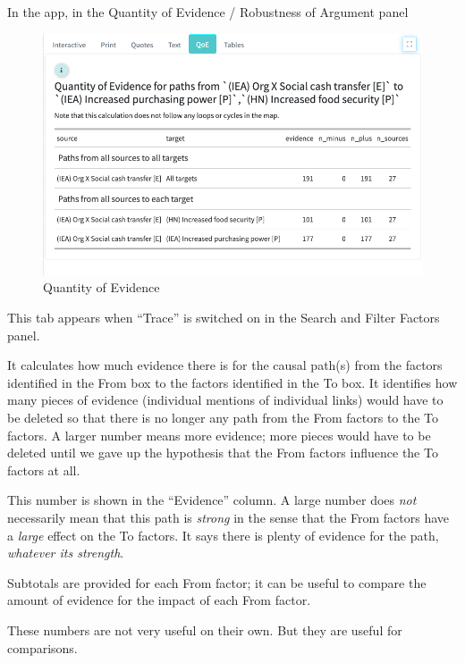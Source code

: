 \documentclass[
]{book}
\begin{document}
In the app, in the Quantity of Evidence / Robustness of Argument panel

\begin{figure}
\centering
\includegraphics{_assets/qoe.png}
\caption{Quantity of Evidence}
\end{figure}

This tab appears when ``Trace'' is switched on in the Search and Filter Factors panel.

It calculates how much evidence there is for the causal path(s) from the factors identified in the From box to the factors identified in the To box. It identifies how many pieces of evidence (individual mentions of individual links) would have to be deleted so that there is no longer any path from the From factors to the To factors. A larger number means more evidence; more pieces would have to be deleted until we gave up the hypothesis that the From factors influence the To factors at all.

This number is shown in the ``Evidence'' column. A large number does \emph{not} necessarily mean that this path is \emph{strong} in the sense that the From factors have a \emph{large} effect on the To factors. It says there is plenty of evidence for the path, \emph{whatever its strength}.

Subtotals are provided for each From factor; it can be useful to compare the amount of evidence for the impact of each From factor.

These numbers are not very useful on their own. But they are useful for comparisons.
\end{document}
